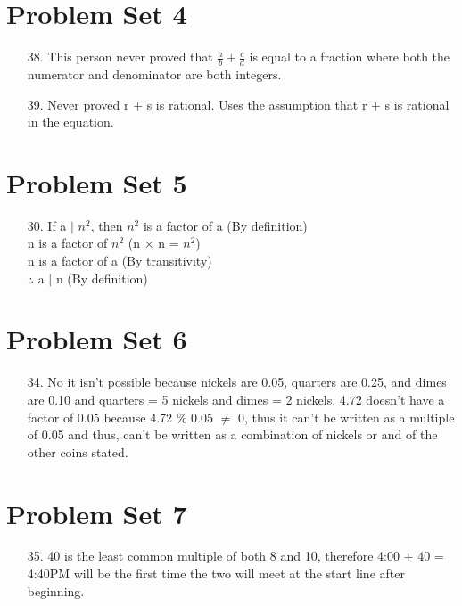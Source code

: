 \documentclass[12pt]{article}
\begin{document}
\section*{Problem Set 4}
\begin{itemize}
    \item [38.]
        This person never proved that $\frac{a}{b} + \frac{c}{d}$ is equal to a
        fraction where both the numerator and denominator are both integers.
    \item [39.]
        Never proved r + s is rational. Uses the assumption that r + s is rational
        in the equation.
\end{itemize}

\section*{Problem Set 5}
\begin{itemize}
    \item [30.]
        If a $\mid$ $n^2$, then $n^2$ is a factor of a (By definition) \\
        n is a factor of $n^2$ (n $\times$ n = $n^2$) \\
        n is a factor of a (By transitivity) \\
        $\therefore$ a $\mid$ n (By definition)
\end{itemize}

\section*{Problem Set 6}
\begin{itemize}
    \item [34.]
        No it isn't possible because nickels are 0.05, quarters are 0.25, and dimes
        are 0.10 and quarters = 5 nickels and dimes = 2 nickels. 4.72 doesn't have
        a factor of 0.05 because 4.72 $\%$ 0.05 $\neq$ 0, thus it can't be written as
        a multiple of 0.05 and thus, can't be written as a combination of nickels or
        and of the other coins stated.
\end{itemize}

\section*{Problem Set 7}
\begin{itemize}
    \item  [35.]
        40 is the least common multiple of both 8 and 10, therefore 4:00 + 40 = 4:40PM
        will be the first time the two will meet at the start line after beginning.
\end{itemize}
\end{document}
